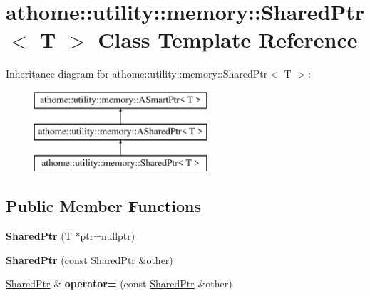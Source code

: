\hypertarget{classathome_1_1utility_1_1memory_1_1_shared_ptr}{}\section{athome\+:\+:utility\+:\+:memory\+:\+:Shared\+Ptr$<$ T $>$ Class Template Reference}
\label{classathome_1_1utility_1_1memory_1_1_shared_ptr}
Inheritance diagram for athome\+:\+:utility\+:\+:memory\+:\+:Shared\+Ptr$<$ T $>$\+:\begin{figure}[H]
\begin{center}
\leavevmode
\includegraphics[height=3.000000cm]{classathome_1_1utility_1_1memory_1_1_shared_ptr}
\end{center}
\end{figure}
\subsection*{Public Member Functions}
\begin{DoxyCompactItemize}
\item 
\mbox{\label{classathome_1_1utility_1_1memory_1_1_shared_ptr_a00ef81dccf95b0f3403fca7c88e3afcc}} 
{\bfseries Shared\+Ptr} (T $\ast$ptr=nullptr)
\item 
\mbox{\label{classathome_1_1utility_1_1memory_1_1_shared_ptr_a367f0527170c73cc7d06eb998624abbb}} 
{\bfseries Shared\+Ptr} (const \mbox{\hyperlink{classathome_1_1utility_1_1memory_1_1_shared_ptr}{Shared\+Ptr}} \&other)
\item 
\mbox{\label{classathome_1_1utility_1_1memory_1_1_shared_ptr_a351afd186617aa438017d87993080dd6}} 
\mbox{\hyperlink{classathome_1_1utility_1_1memory_1_1_shared_ptr}{Shared\+Ptr}} \& {\bfseries operator=} (const \mbox{\hyperlink{classathome_1_1utility_1_1memory_1_1_shared_ptr}{Shared\+Ptr}} \&other)
\end{DoxyCompactItemize}
